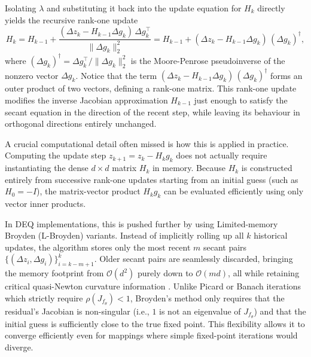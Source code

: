 Isolating $\lambda$ and substituting it back into the update equation for $H_k$ directly yields the recursive rank-one update
\begin{equation*}
    H_k
    = H_{k-1}
    + \frac{(\Delta z_k-H_{k-1}\Delta g_k)\,\Delta g_k^{\top}}{\|\Delta g_k\|_2^2}
    = H_{k-1} + (\Delta z_k-H_{k-1}\Delta g_k)\,(\Delta g_k)^\dagger,
\end{equation*}
where $(\Delta g_k)^\dagger = \Delta g_k^{\top}/\|\Delta g_k\|_2^2$ is the Moore-Penrose pseudoinverse of the nonzero vector $\Delta g_k$. Notice that the term $(\Delta z_k-H_{k-1}\Delta g_k)\,(\Delta g_k)^\dagger$ forms an outer product of two vectors, defining a rank-one matrix. This rank-one update modifies the inverse Jacobian approximation $H_{k-1}$ just enough to satisfy the secant equation in the direction of the recent step, while leaving its behaviour in orthogonal directions entirely unchanged.

A crucial computational detail often missed is how this is applied in practice. Computing the update step $z_{k+1} = z_k - H_k g_k$ does not actually require instantiating the dense $d \times d$ matrix $H_k$ in memory. Because $H_k$ is constructed entirely from successive rank-one updates starting from an initial guess (such as $H_0 = -I$), the matrix-vector product $H_k g_k$ can be evaluated efficiently using only vector inner products. 

In DEQ implementations, this is pushed further by using Limited-memory Broyden (L-Broyden) variants. Instead of implicitly rolling up all $k$ historical updates, the algorithm stores only the most recent $m$ secant pairs $\{(\Delta z_i, \Delta g_i)\}_{i=k-m+1}^k$. Older secant pairs are seamlessly discarded, bringing the memory footprint from $\mathcal{O}(d^2)$ purely down to $\mathcal{O}(md)$, all while retaining critical quasi-Newton curvature information \cite{broyden1965class, bai2019deep}. Unlike Picard or Banach iterations which strictly require $\rho(J_{f_\theta}) < 1$, Broyden's method only requires that the residual's Jacobian is non-singular (i.e., $1$ is not an eigenvalue of $J_{f_\theta}$) and that the initial guess is sufficiently close to the true fixed point. This flexibility allows it to converge efficiently even for mappings where simple fixed-point iterations would diverge.

